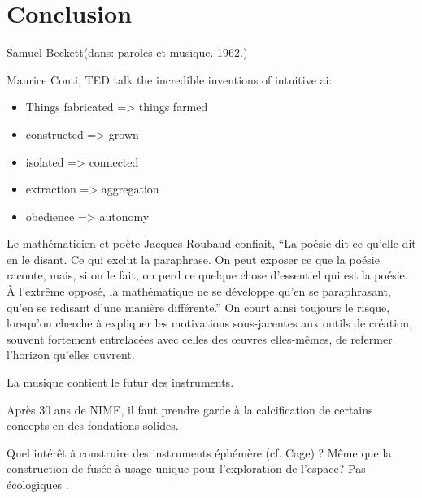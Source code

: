 %
\chapter{Conclusion}
\label{ch:conclusion}

{Samuel Beckett}{(dans: paroles et musique. 1962.)}

Maurice Conti, TED talk the incredible inventions of intuitive ai:
\vspace{-1em}
\begin{itemize}[noitemsep]
	\item Things fabricated => things farmed
	\item constructed => grown
	\item isolated => connected
	\item extraction => aggregation
	\item obedience => autonomy
\end{itemize}


Le mathématicien et poète Jacques Roubaud confiait, ``La poésie dit ce qu’elle dit en le disant. Ce qui exclut la paraphrase. On peut exposer ce que la poésie raconte, mais, si on le fait, on perd ce quelque chose d’essentiel qui est la poésie. À l’extrême opposé, la mathématique ne se développe qu’en se paraphrasant, qu’en se redisant d’une manière différente.''
On court ainsi toujours le risque, lorsqu'on cherche à expliquer les motivations sous-jacentes aux outils de création, souvent fortement entrelacées avec celles des œuvres elles-mêmes, de refermer l'horizon qu'elles ouvrent.

La musique contient le futur des instruments.


Après 30 ans de NIME, il faut prendre garde à la calcification de certains concepts en des fondations solides. 

Quel intérêt à construire des instruments éphémère (cf. Cage) ?
Même que la construction de fusée à usage unique pour l'exploration de l'espace?
Pas écologiques .